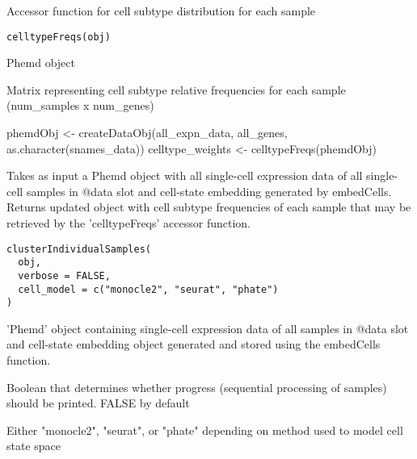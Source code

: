 \documentclass[a4paper]{book}
\begin{document}
%
\begin{Description}\relax
Accessor function for cell subtype distribution for each sample
\end{Description}
%
\begin{Usage}
\begin{verbatim}
celltypeFreqs(obj)
\end{verbatim}
\end{Usage}
%
\begin{Arguments}
\begin{ldescription}
\item[\code{obj}] Phemd object
\end{ldescription}
\end{Arguments}
%
\begin{Value}
Matrix representing cell subtype relative frequencies for each sample (num\_samples x num\_genes)
\end{Value}
%
\begin{Examples}
\begin{ExampleCode}
phemdObj <- createDataObj(all_expn_data, all_genes, as.character(snames_data))
celltype_weights <- celltypeFreqs(phemdObj)

\end{ExampleCode}
\end{Examples}
%
\begin{Description}\relax
Takes as input a Phemd object with all single-cell expression data of all single-cell samples in @data slot and cell-state embedding generated by embedCells. Returns updated object with cell subtype frequencies of each sample that may be retrieved by the 'celltypeFreqs' accessor function.
\end{Description}
%
\begin{Usage}
\begin{verbatim}
clusterIndividualSamples(
  obj,
  verbose = FALSE,
  cell_model = c("monocle2", "seurat", "phate")
)
\end{verbatim}
\end{Usage}
%
\begin{Arguments}
\begin{ldescription}
\item[\code{obj}] 'Phemd' object containing single-cell expression data of all samples in @data slot and cell-state embedding object generated and stored using the embedCells function.

\item[\code{verbose}] Boolean that determines whether progress (sequential processing of samples) should be printed. FALSE by default

\item[\code{cell\_model}] Either "monocle2", "seurat", or "phate" depending on method used to model cell state space
\end{ldescription}
\end{Arguments}
\end{document}

